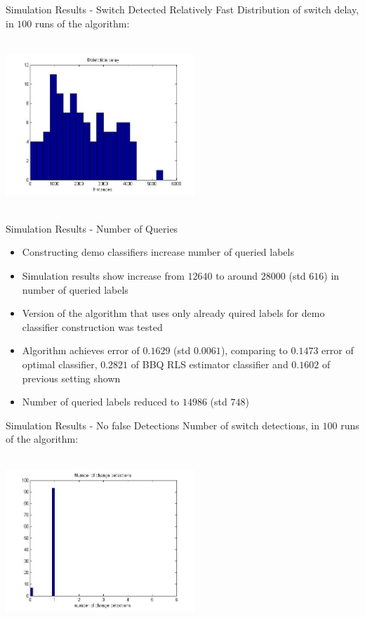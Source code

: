 \documentclass{beamer}
\begin{document}
\begin{frame}{Simulation Results - Switch Detected Relatively Fast}
Distribution of switch delay, in $100$ runs of the algorithm:
\begin{center}
\includegraphics[height=2.5in,width=2.8in]{delay_reg_alg2.jpg}
\end{center}
\end{frame}

\begin{frame}{Simulation Results - Number of Queries}
\begin{itemize}
\item Constructing demo classifiers increase number of queried labels\newline
\item Simulation results show increase from $12640$ to around $28000$ (std $616$) in number of queried labels\newline 
\item Version of the algorithm that uses only already quired labels for demo classifier construction was tested\newline
\item Algorithm achieves error of $0.1629$ (std $0.0061$), comparing to $0.1473$ error of optimal classifier, $0.2821$ of BBQ RLS estimator classifier and $0.1602$ of previous setting shown\newline
\item Number of queried labels reduced to $14986$ (std $748$)
\end{itemize}
\end{frame}

\begin{frame}{Simulation Results - No false Detections}
Number of switch detections, in $100$ runs of the algorithm:
\begin{center}
\includegraphics[height=2.5in,width=2.8in]{Ndet_reg_alg3.jpg}
\end{center}
\end{frame}
\end{document}
